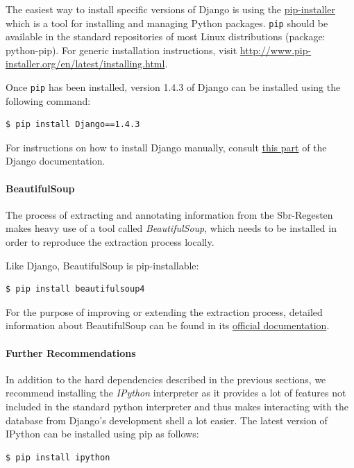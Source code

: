 The easiest way to install specific versions of Django is using the
\href{http://www.pip-installer.org/en/latest/}{pip-installer} which is
a tool for installing and managing Python packages. \texttt{pip}
should be available in the standard repositories of most Linux
distributions (package: python-pip). For generic installation
instructions, visit
\url{http://www.pip-installer.org/en/latest/installing.html}.

Once \texttt{pip} has been installed, version 1.4.3 of Django can be
installed using the following command:

\begin{verbatim}
$ pip install Django==1.4.3
\end{verbatim}

For instructions on how to install Django manually, consult
\href{https://www.djangoproject.com/download/}{this part} of the
Django documentation.

\paragraph{BeautifulSoup}
The process of extracting and annotating information from the
Sbr-Regesten makes heavy use of a tool called \emph{BeautifulSoup},
which needs to be installed in order to reproduce the extraction
process locally.

Like Django, BeautifulSoup is pip-installable:

\begin{verbatim}
$ pip install beautifulsoup4
\end{verbatim}

For the purpose of improving or extending the extraction process,
detailed information about BeautifulSoup can be found in its
\href{http://www.crummy.com/software/BeautifulSoup/bs4/doc/}{official documentation}.

\paragraph{Further Recommendations}
In addition to the hard dependencies described in the previous
sections, we recommend installing the \emph{IPython} interpreter as it
provides a lot of features not included in the standard python
interpreter and thus makes interacting with the database from Django's
development shell a lot easier. The latest version of IPython can be
installed using pip as follows:

\begin{verbatim}
$ pip install ipython
\end{verbatim}

